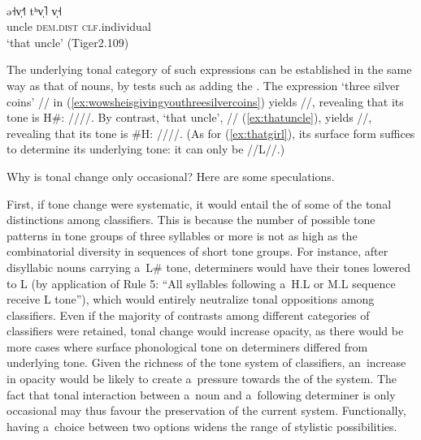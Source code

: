 \begin{exe}
	\ex
	\label{ex:thatuncle}
	\\
	\gll ə˧v̩˧˥	tʰv̩˥	v̩˧\\
	uncle	\textsc{dem.dist}	\textsc{clf}.individual\\
	\glt ‘that uncle’ (Tiger2.109)
\end{exe}

The underlying tonal category of such
expressions can be established in the same way as that of nouns, by tests such as adding the
. The expression ‘three silver coins’ // in (\ref{ex:wowsheisgivingyouthreesilvercoins}) yields //,
revealing that its tone is H\#: ////. By contrast, ‘that uncle’, // (\ref{ex:thatuncle}),
yields //, revealing that its tone is \#H: ////. (As for (\ref{ex:thatgirl}), its surface form suffices to determine its underlying tone: it can only be //L//.)

Why is tonal change only occasional? Here are some speculations. 

First, if tone change were systematic, it would entail the  of some of the tonal distinctions
among classifiers. This is because the number of possible tone patterns in tone groups of three syllables or
more is not as high as the combinatorial diversity in sequences of short tone
groups. For instance, after disyllabic nouns carrying a~L\# tone, determiners would have their tones
lowered to L (by application of Rule 5: “All syllables following a~H.L or M.L sequence receive L tone”), which would entirely neutralize tonal oppositions among classifiers. Even if the majority of
contrasts among different categories of classifiers were retained, tonal change would increase
opacity, as there would be more cases where surface phonological tone on determiners differed from
underlying tone. Given the richness of the tone system of classifiers, an~increase
in opacity would be likely to create a~pressure towards the  of the system. The fact
that tonal interaction between a~noun and a~following determiner is only occasional may thus favour
the preservation of the current system. Functionally, having a~choice between two options widens the range of stylistic possibilities.

\label{sec:anasymmetricalsystemsometonesaremorepronetochangethanothers}

